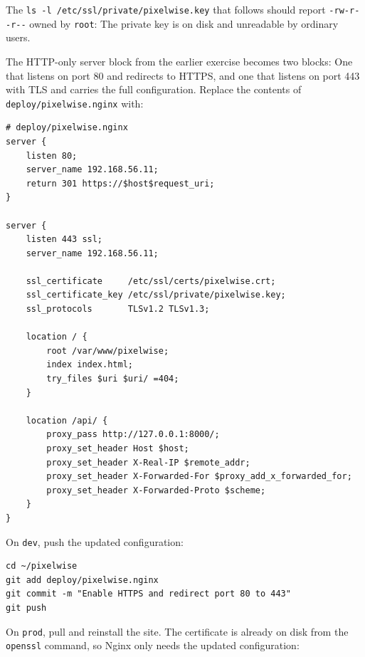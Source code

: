 The \texttt{ls -l /etc/ssl/private/pixelwise.key} that follows should
report \texttt{-rw-r-{}-r-{}-} owned by \texttt{root}: The private key is
on disk and unreadable by ordinary users.

The HTTP-only server block from the earlier exercise becomes two
blocks: One that listens on port 80 and redirects to HTTPS, and one
that listens on port 443 with TLS and carries the full configuration.
Replace the contents of \texttt{deploy/pixelwise.nginx} with:

\begin{verbatim}
# deploy/pixelwise.nginx
server {
    listen 80;
    server_name 192.168.56.11;
    return 301 https://$host$request_uri;
}

server {
    listen 443 ssl;
    server_name 192.168.56.11;

    ssl_certificate     /etc/ssl/certs/pixelwise.crt;
    ssl_certificate_key /etc/ssl/private/pixelwise.key;
    ssl_protocols       TLSv1.2 TLSv1.3;

    location / {
        root /var/www/pixelwise;
        index index.html;
        try_files $uri $uri/ =404;
    }

    location /api/ {
        proxy_pass http://127.0.0.1:8000/;
        proxy_set_header Host $host;
        proxy_set_header X-Real-IP $remote_addr;
        proxy_set_header X-Forwarded-For $proxy_add_x_forwarded_for;
        proxy_set_header X-Forwarded-Proto $scheme;
    }
}
\end{verbatim}


On \texttt{dev}, push the updated configuration:

\begin{verbatim}
cd ~/pixelwise
git add deploy/pixelwise.nginx
git commit -m "Enable HTTPS and redirect port 80 to 443"
git push
\end{verbatim}

On \texttt{prod}, pull and reinstall the site.
The certificate is already on disk from the \texttt{openssl} command, so
Nginx only needs the updated configuration:

